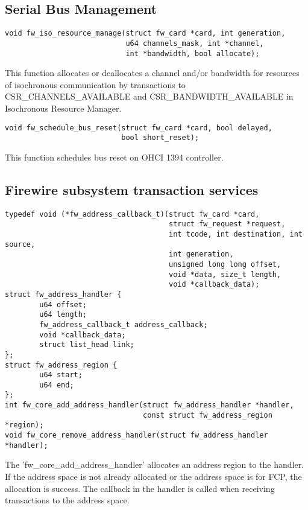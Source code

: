 \documentclass[onecolumn]{jarticle}
\begin{document}
\subsection{Serial Bus Management}

\begin{verbatim}
void fw_iso_resource_manage(struct fw_card *card, int generation,
                            u64 channels_mask, int *channel,
                            int *bandwidth, bool allocate);
\end{verbatim}

This function allocates or deallocates a channel and/or bandwidth for resources of isochronous communication by transactions to CSR\_CHANNELS\_AVAILABLE and CSR\_BANDWIDTH\_AVAILABLE in Isochronous Resource Manager.

\begin{verbatim}
void fw_schedule_bus_reset(struct fw_card *card, bool delayed,
                           bool short_reset);
\end{verbatim}

This function schedules bus reset on OHCI 1394 controller.

\subsection{Firewire subsystem transaction services}

\begin{verbatim}
typedef void (*fw_address_callback_t)(struct fw_card *card,
                                      struct fw_request *request,
                                      int tcode, int destination, int source,
                                      int generation,
                                      unsigned long long offset,
                                      void *data, size_t length,
                                      void *callback_data);
struct fw_address_handler {
        u64 offset;
        u64 length;
        fw_address_callback_t address_callback;
        void *callback_data;
        struct list_head link;
};
struct fw_address_region {
        u64 start;
        u64 end;
};
int fw_core_add_address_handler(struct fw_address_handler *handler,
                                const struct fw_address_region *region);
void fw_core_remove_address_handler(struct fw_address_handler *handler);
\end{verbatim}

The 'fw\_core\_add\_address\_handler' allocates an address region to the handler. If the address space is not already allocated or the address space is for FCP, the allocation is success. The callback in the handler is called when receiving transactions to the address space.
\end{document}
